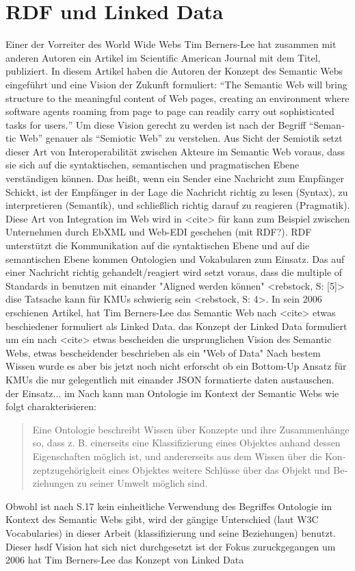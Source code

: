 \section{RDF und Linked Data}
\label{sec:linked-data}

Einer der Vorreiter des World Wide Webs Tim Berners-Lee hat zusammen mit anderen Autoren \citeyear{berners2001semantic} ein Artikel im Scientific American Journal mit dem Titel,  publiziert. In diesem Artikel haben die Autoren der Konzept des Semantic Webs eingeführt und eine Vision der Zukunft formuliert: \hyphenquote{german}{The Semantic Web will bring structure to the meaningful content of Web pages, creating an environment where software agents roaming from page to page can readily carry out sophisticated tasks for users.} Um diese Vision gerecht zu werden ist nach \citeauthor{blumauer2006semantic} der Begriff \hyphenquote{german}{Semantic Web} genauer als \hyphenquote{german}{Semiotic Web} zu verstehen. Aus Sicht der Semiotik setzt dieser Art von Interoperabilität zwischen Akteure im Semantic Web voraus, dass sie sich auf die syntaktischen, semantischen und pragmatischen Ebene verständigen können. Das heißt, wenn ein Sender eine Nachricht zum Empfänger Schickt, ist der Empfänger in der Lage die Nachricht richtig zu lesen (Syntax), zu interpretieren (Semantik), und schließlich richtig darauf zu reagieren (Pragmatik)\parencite[vgl.]{voigtmann2002enterprise}. Diese Art von Integration im Web wird in <cite> für kann zum Beispiel zwischen Unternehmen durch EbXML und Web-EDI geschehen (mit RDF?).  RDF unterstützt die Kommunikation auf die syntaktischen Ebene und auf die semantischen Ebene kommen Ontologien und Vokabularen zum Einsatz. Das auf einer Nachricht richtig gehandelt/reagiert wird setzt voraus, dass die multiple of Standards in benutzen mit einander "Aligned werden können" <rebstock, S: [5]> dise Tatsache kann für KMUs schwierig sein <rebstock, S: 4>. In sein 2006 erschienen Artikel, hat Tim Berners-Lee das Semantic Web nach <cite> etwas beschiedener formuliert als Linked Data. das Konzept der Linked Data formuliert um ein nach <cite> etwas bescheiden die ursprunglichen Vision des Semantic Webs, etwas bescheidender beschrieben als ein "Web of Data" Nach bestem Wissen wurde es aber bis jetzt noch nicht erforscht ob ein Bottom-Up Ansatz für KMUs die nur gelegentlich mit einander JSON formatierte daten austauschen.  der Einsatz...   im Nach \citeauthor[S.~488]{may2006semantic} kann man Ontologie im Kontext der Semantic Webs wie folgt charakterisieren: \hyphenblockquote{german}{Eine Ontologie beschreibt Wissen über Konzepte und ihre Zusammenhänge so, dass z. B. einerseits eine Klassifizierung eines Objektes anhand dessen Eigenschaften möglich ist, und andererseits aus dem Wissen über die Konzeptzugehörigkeit eines Objektes weitere Schlüsse über das Objekt und Beziehungen zu seiner Umwelt möglich sind.} Obwohl ist nach S.17 kein einheitliche Verwendung des Begriffes Ontologie im Kontext des Semantic Webs gibt, wird der gängige Unterschied (laut W3C Vocabularies) in dieser Arbeit (klassifizierung und seine Beziehungen) benutzt. Dieser hsdf Vision hat sich nict durchgesetzt ist der Fokus zuruckgegangen um 2006 hat Tim Berners-Lee das Konzept von Linked Data 